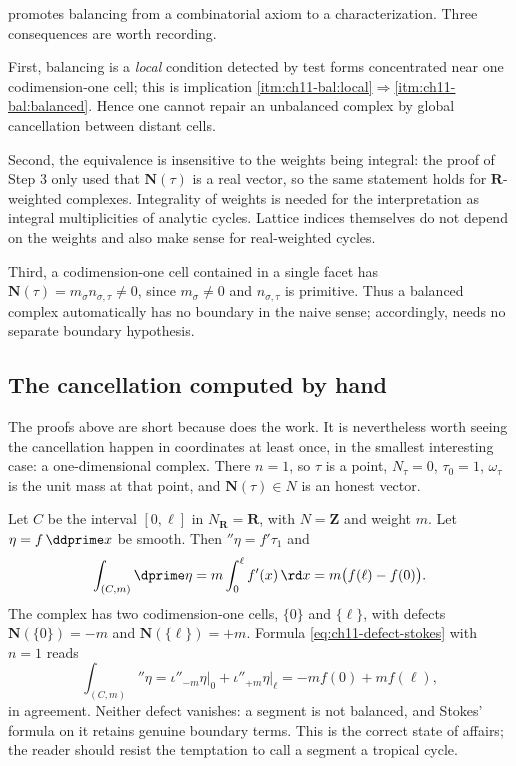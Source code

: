 \begin{remark}
\label{rem:ch11-converse-meaning}
 promotes balancing from a combinatorial
axiom to a characterization.  Three consequences are worth recording.

First, balancing is a \emph{local} condition detected by test forms
concentrated near one codimension-one cell; this is implication
\cref{itm:ch11-bal:local}$\Rightarrow$\cref{itm:ch11-bal:balanced}.  Hence one
cannot repair an unbalanced complex by global cancellation between distant
cells.

Second, the equivalence is insensitive to the weights being integral: the
proof of Step 3 only used that $\mathbf N(\tau)$ is a real vector, so the
same statement holds for $\mathbf R$-weighted complexes.  Integrality of
weights is needed for the interpretation as integral multiplicities of
analytic cycles.  Lattice indices themselves do not depend on the
weights and also make sense for real-weighted cycles.

Third, a codimension-one cell contained in a single facet has
$\mathbf N(\tau)=m_\sigma n_{\sigma,\tau}\neq0$, since $m_\sigma\neq0$ and
$n_{\sigma,\tau}$ is primitive.  Thus a balanced complex automatically has
no boundary in the naive sense; accordingly,
 needs no separate boundary hypothesis.
\end{remark}

\subsection{The cancellation computed by hand}
\label{sec:ch11-hand-cancellation}

The proofs above are short because  does the
work.  It is nevertheless worth seeing the cancellation happen in
coordinates at least once, in the smallest interesting case: a
one-dimensional complex.  There $n=1$, so $\tau$ is a point, $N_\tau=0$,
$\tau_0=1$, $\omega_\tau$ is the unit mass at that point, and
$\mathbf N(\tau)\in N$ is an honest vector.

\begin{example}
\label{ex:ch11-segment-stokes}
Let $C$ be the interval $[0,\ell]$ in $N_{\mathbf R}=\mathbf R$, with
$N=\mathbf Z$ and weight $m$.  Let $\eta=f\,\ddprime x$ be smooth.  Then
$\dprime\eta=f'\tau_1$ and
\[
 \int_{(C,m)}\dprime\eta=m\int_0^\ell f'(x)\,\rd x=m\bigl(f(\ell)-f(0)\bigr).
\]
The complex has two codimension-one cells, $\{0\}$ and $\{\ell\}$, with
defects $\mathbf N(\{0\})=-m$ and $\mathbf N(\{\ell\})=+m$.  Formula
\eqref{eq:ch11-defect-stokes} with $n=1$ reads
\[
 \int_{(C,m)}\dprime\eta
 =\iota''_{-m}\eta\big|_{0}+\iota''_{+m}\eta\big|_{\ell}
 =-mf(0)+mf(\ell),
\]
in agreement.  Neither defect vanishes: a segment is not balanced, and
Stokes' formula on it retains genuine boundary terms.  This is the correct
state of affairs; the reader should resist the temptation to call a segment
a tropical cycle.
\end{example}


